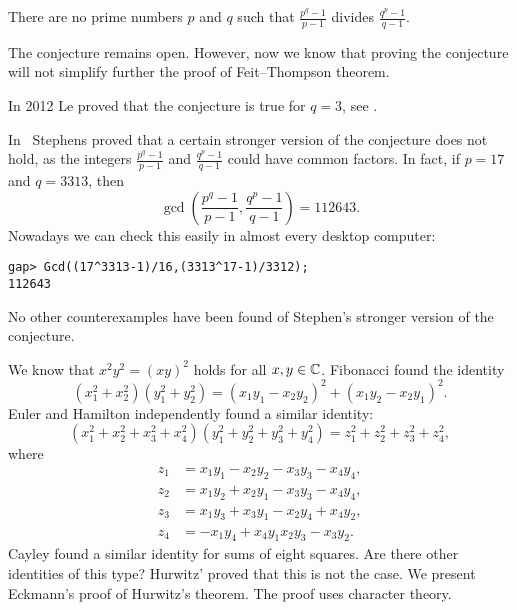 \begin{conjecture}
    There are no prime numbers $p$ and $q$ such that
    $\frac {p^{q}-1}{p-1}$ divides $\frac{q^{p} - 1}{q - 1}$. 
\end{conjecture}

The conjecture remains open. However, now we know that 
proving the conjecture will not simplify further
the proof of Feit--Thompson theorem. 

In 2012 Le proved that the conjecture is true for $q=3$, see 
\cite{MR2900154}. 


In~\cite{MR297686} 
Stephens proved that a certain stronger version of the conjecture 
does not hold, as the integers 
$\frac {p^{q}-1}{p-1}$ and $\frac{q^{p} - 1}{q - 1}$ 
could have common factors. In fact, if $p=17$ and $q=3313$, 
then 
\[
\gcd\left(\frac {p^{q}-1}{p-1},\frac{q^{p} - 1}{q - 1}\right)=112643.
\]
Nowadays we can check this easily in almost every desktop computer:
\begin{lstlisting}
gap> Gcd((17^3313-1)/16,(3313^17-1)/3312);
112643
\end{lstlisting}
No other counterexamples have been found of Stephen’s stronger version of the conjecture.

\label{Hurwitz}

We know that $x^2y^2=(xy)^2$ holds for all $x,y\in\mathbb{C}$. Fibonacci
found the identity
\[
	(x_1^2+x_2^2)(y_1^2+y_2^2)=(x_1y_1-x_2y_2)^2+(x_1y_2-x_2y_1)^2.
\]
Euler and Hamilton independently found 
a similar identity:
\[
	(x_1^2+x_2^2+x_3^2+x_4^2)(y_1^2+y_2^2+y_3^2+y_4^2)=z_1^2+z_2^2+z_3^2+z_4^2,
\]
where
\begin{equation}
\label{eq:Hamilton}
\begin{aligned}
	 z_1&=x_1y_1-x_2y_2-x_3y_3-x_4y_4,\\
	 z_2&=x_1y_2+x_2y_1-x_3y_3-x_4y_4,\\
	 z_3&=x_1y_3+x_3y_1-x_2y_4+x_4y_2,\\ 
	 z_4&=-x_1y_4+x_4y_1x_2y_3-x_3y_2.
\end{aligned}
\end{equation}
Cayley found a similar identity for sums of eight squares. 
Are there other identities of this type? Hurwitz' proved that this is not the case. 
We present Eckmann's proof of Hurwitz's theorem. The proof uses character theory.


